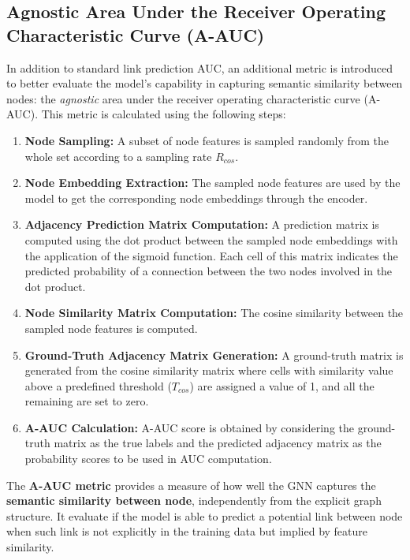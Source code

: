 \documentclass[11pt]{article}
\begin{document}
	\subsection{Agnostic Area Under the Receiver Operating Characteristic Curve (A-AUC)}
	In addition to standard link prediction AUC, an additional metric is introduced to better evaluate the model's capability in capturing semantic similarity between nodes: the \textit{agnostic} area under the receiver operating characteristic curve (A-AUC). This metric is calculated using the following steps:
	\begin{enumerate}
		\item \textbf{Node Sampling:} A subset of node features is sampled randomly from the whole set according to a sampling rate $R_{cos}$.
		
		\item \textbf{Node Embedding Extraction:} The sampled node features are used by the model to get the corresponding node embeddings through the encoder.
		
		\item \textbf{Adjacency Prediction Matrix Computation:}  A prediction matrix is computed using the dot product between the sampled node embeddings with the application of the sigmoid function. Each cell of this matrix indicates the predicted probability of a connection between the two nodes involved in the dot product.
		
		\item \textbf{Node Similarity Matrix Computation:} The cosine similarity between the sampled node features is computed.
		
		\item \textbf{Ground-Truth Adjacency Matrix Generation:} A ground-truth matrix is generated from the cosine similarity matrix where cells with similarity value above a predefined threshold ($T_{cos}$) are assigned a value of 1, and all the remaining are set to zero.
		
		\item \textbf{A-AUC Calculation:} A-AUC score is obtained by considering the ground-truth matrix as the true labels and the predicted adjacency matrix as the probability scores to be used in AUC computation.
	\end{enumerate}
	The \textbf{A-AUC metric} provides a measure of how well the GNN captures the \textbf{semantic similarity between node}, independently from the explicit graph structure. It evaluate if the model is able to predict a potential link between node when such link is not explicitly in the training data but implied by feature similarity.
	
\end{document}
